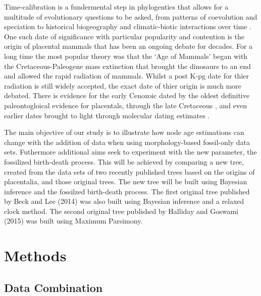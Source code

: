 \documentclass[11pt,letterpaper]{article}
\begin{document}
Time-calibration is a fundermental step in phylogentics that allows for a multitude of evolutionary questions to be asked, from patterns of coevolution and speciation to historical biogeography and climatic-biotic interactions over time \citep{heath2014fossilized}. One such date of significance with particular popularity and contention is the origin of placental mammals that has been an ongoing debate for decades. For a long time the most popular theory was that the `Age of Mammals' began with the Cretaceous-Paleogene mass extinction that brought the dinosaurs to an end and allowed the rapid radiation of mammals. Whilst a post K-pg date for thier radiation is still widely accepted, the exact date of thier origin is much more debated. There is evidence for the early Cenozoic \citep{wible2007cretaceous} dated by the oldest definitive paleontogloical evidence for placentals, through the late Cretaceous \citep{archibald2011protungulatum}, \citep{hooker2014new} and even earlier dates brought to light through molecular dating estimates \citep{dos2012phylogenomic}.   

The main objective of our study is to illustrate how node age estimations can change with the addition of data when using morphology-based fossil-only data sets. Futhermore additional aims seek to experiment with the new parameter, the fossilized birth-death process. This will be achieved by comparing a new tree, created from the data sets of two recently published trees based on the origins of placentalia, and those original trees. The new tree will be built using Bayesian inference and the fossilzed birth-death process. The first original tree published by Beck and Lee (2014) was also built using Bayesian inference and a relaxed clock method. The second original tree published by Halliday and Goswami (2015) was built using Maximum Parsimony.

\section*{Methods}

\subsection*{Data Combination}
\end{document}
